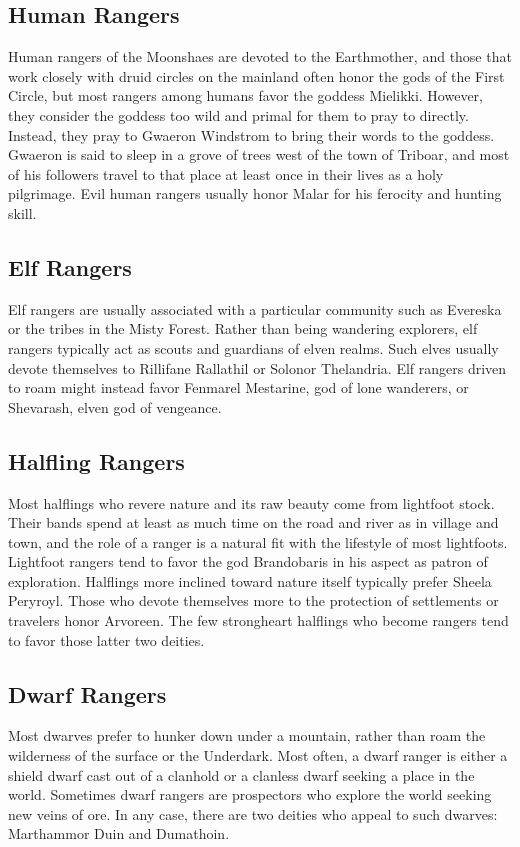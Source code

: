 \documentclass[10pt,a4paper,twoside,twocolumn,openany,bg=print,nodeprecatedcode]{dndbook}
\begin{document}
\subsection{Human Rangers}
Human rangers of the Moonshaes are devoted to the Earthmother, and those that work closely with druid circles on the mainland often honor the gods of the First Circle, but most rangers among humans favor the goddess Mielikki. However, they consider the goddess too wild and primal for them to pray to directly. Instead, they pray to Gwaeron Windstrom to bring their words to the goddess. Gwaeron is said to sleep in a grove of trees west of the town of Triboar, and most of his followers travel to that place at least once in their lives as a holy pilgrimage. Evil human rangers usually honor Malar for his ferocity and hunting skill.
\subsection{Elf Rangers}
Elf rangers are usually associated with a particular community such as Evereska or the tribes in the Misty Forest. Rather than being wandering explorers, elf rangers typically act as scouts and guardians of elven realms. Such elves usually devote themselves to Rillifane Rallathil or Solonor Thelandria. Elf rangers driven to roam might instead favor Fenmarel Mestarine, god of lone wanderers, or Shevarash, elven god of vengeance.
\subsection{Halfling Rangers}
Most halflings who revere nature and its raw beauty come from lightfoot stock. Their bands spend at least as much time on the road and river as in village and town, and the role of a ranger is a natural fit with the lifestyle of most lightfoots. Lightfoot rangers tend to favor the god Brandobaris in his aspect as patron of exploration. Halflings more inclined toward nature itself typically prefer Sheela Peryroyl. Those who devote themselves more to the protection of settlements or travelers honor Arvoreen. The few strongheart halflings who become rangers tend to favor those latter two deities.
\subsection{Dwarf Rangers}
Most dwarves prefer to hunker down under a mountain, rather than roam the wilderness of the surface or the Underdark. Most often, a dwarf ranger is either a shield dwarf cast out of a clanhold or a clanless dwarf seeking a place in the world. Sometimes dwarf rangers are prospectors who explore the world seeking new veins of ore. In any case, there are two deities who appeal to such dwarves: Marthammor Duin and Dumathoin.
\end{document}
